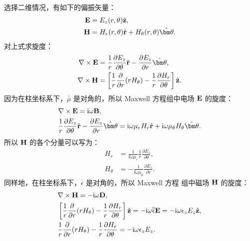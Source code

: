 \documentclass{sjtureport}
\begin{document}
选择二维情况，有如下的偏振矢量：
\begin{subequations}
  \begin{align}
    {\bf E} &= E_z(r, \theta) \hat{\bf z}, \\
    {\bf H} &= H_r(r, \theta) \hat{\bf r} + H_\theta(r, \theta) \hat{\bm\theta}.
  \end{align}
\end{subequations}
对上式求旋度：
\begin{subequations}
  \begin{align}
    \nabla \times {\bf E} &= \frac{1}{r} \frac{\partial E_z}{\partial\theta}
      \hat{\bf r} - \frac{\partial E_z}{\partial r} \hat{\bm\theta}, \\
    \nabla \times {\bf H} &= \left[\frac{1}{r} \frac{\partial}{\partial r}
      (r H_\theta) - \frac{1}{r} \frac{\partial H_r}{\partial\theta} \right]
      \hat{\bf z}.
  \end{align}
\end{subequations}
因为在柱坐标系下，$\overline{\overline\mu}$ 是对角的，所以 Maxwell 方程组中电场
$\bf E$ 的旋度：
\begin{subequations}
  \begin{align}
    & \nabla \times {\bf E} = \ii \omega {\bf B}, \\
    & \frac{1}{r} \frac{\partial E_z}{\partial\theta} \hat{\bf r} -
      \frac{\partial E_z}{\partial r}\hat{\bm\theta} = \ii \omega \mu_r H_r
      \hat{\bf r} + \ii \omega \mu_\theta H_\theta \hat{\bm\theta}.
  \end{align}
\end{subequations}
所以 $\bf H$ 的各个分量可以写为：
\begin{subequations}
  \begin{align}
    H_r &= \frac{1}{\ii \omega \mu_r} \frac{1}{r}
      \frac{\partial E_z}{\partial\theta}, \\
    H_\theta &= -\frac{1}{\ii \omega \mu_\theta}
      \frac{\partial E_z}{\partial r}.
  \end{align}
\end{subequations}
同样地，在柱坐标系下，$\overline{\overline\epsilon}$ 是对角的，所以 Maxwell 方程
组中磁场 $\bf H$ 的旋度：
\begin{subequations}
  \begin{align}
    & \nabla \times {\bf H} = -\mathrm{i} \omega {\bf D}, \\
    & \left[\frac{1}{r} \frac{\partial}{\partial r}(r H_\theta) - \frac{1}{r}
      \frac{\partial H_r}{\partial\theta} \right] \hat{\bf z} = -\mathrm{i} \omega
      {\overline{\overline\epsilon}} {\bf E} = -\mathrm{i} \omega \epsilon_z E_z
      \hat{\bf z}, \\
    & \frac{1}{r} \frac{\partial}{\partial r}(r H_\theta) - \frac{1}{r}
      \frac{\partial H_r}{\partial\theta} = -\mathrm{i} \omega \epsilon_z E_z.
  \end{align}
\end{subequations}
\end{document}
